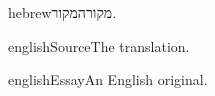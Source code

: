 \documentclass{article}
\begin{document}
\begin{mekor}
\begin{mekorlang}{hebrew}{מקור}המקור.\end{mekorlang}
\begin{mekorlang}{english}{Source}The translation.\end{mekorlang}
\end{mekor}
\begin{mekor}
\begin{mekorlang}{english}{Essay}An English original.\end{mekorlang}
\end{mekor}
\end{document}

